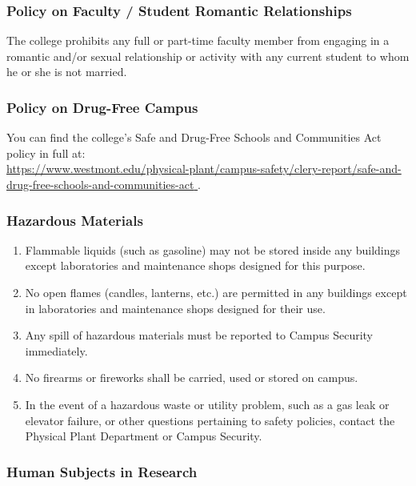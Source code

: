 		\subsubsection{Policy on Faculty / Student Romantic Relationships}
			The college prohibits any full or part-time faculty member from engaging in a romantic and/or sexual relationship or activity with any current student to whom he or she is not married.
		\subsubsection{Policy on Drug-Free Campus}
			You can find the college's Safe and Drug-Free Schools and Communities Act policy in full at: \\
			\href{
				https://www.westmont.edu/physical-plant/campus-safety/clery-report/safe-and-drug-free-schools-and-communities-act
			}{
				\url{https://www.westmont.edu/physical-plant/campus-safety/clery-report/safe-and-drug-free-schools-and-communities-act}
			}.
		\subsubsection{Hazardous Materials}

			\begin{enumerate}[label=\alph*)]

				\item{ Flammable liquids (such as gasoline) may not be stored inside
					any buildings except laboratories and maintenance shops designed for
					this purpose. }

				\item{ No open flames (candles, lanterns, etc.) are permitted in any
					buildings except in laboratories and maintenance shops designed for
					their use. }

				\item{ Any spill of hazardous materials must be reported to Campus
					Security immediately. }

				\item{ No firearms or fireworks shall be carried, used or stored on
					campus. }

				\item{ In the event of a hazardous waste or utility problem, such as
					a gas leak or elevator failure, or other questions pertaining to
					safety policies, contact the Physical Plant Department or Campus
					Security. }

			\end{enumerate}
		\subsubsection{Human Subjects in Research}

